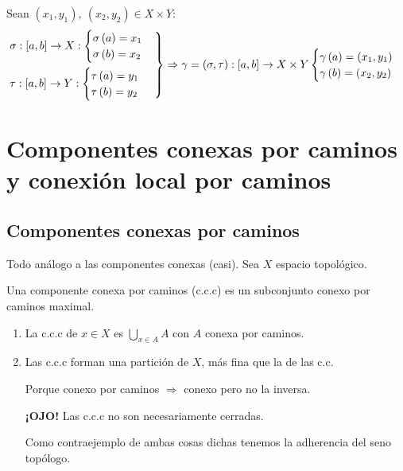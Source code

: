 \begin{prop}[Productos]
Sean $\left( x_1, y_1 \right),\ \left( x_2, y_2 \right) \in X \times Y$: 
\[
\begin{rcases}
    \sigma: \left[ a, b \right] \rightarrow X: \begin{cases}
        \sigma\left( a \right) = x_1\\
        \sigma\left( b \right) = x_2
    \end{cases}\\
    \tau: \left[ a, b \right] \rightarrow Y: \begin{cases}
        \tau\left( a \right) = y_1\\
        \tau\left( b \right) = y_2
    \end{cases}
\end{rcases} 
    \Rightarrow \gamma = \left( \sigma, \tau \right) : \left[ a, b \right] \rightarrow X \times Y \begin{cases}
        \gamma\left( a \right) = \left( x_1, y_1 \right)\\
        \gamma\left( b \right) = \left( x_2, y_2 \right)
    \end{cases}  
\]
\end{prop}


\chapter{Componentes conexas por caminos y conexión local por caminos}%
\label{cha:componentes_conexas_por_caminos_y_conexion_local_por_caminos}
\section{Componentes conexas por caminos}%
\label{sec:componentes_conexas_por_caminos}
Todo análogo a las componentes conexas (casi). Sea $X$ espacio topológico.
\begin{defi}
Una componente conexa por caminos (c.c.c) es un subconjunto conexo por caminos maximal.
\end{defi}
\begin{prop}[Descripción]
\begin{enumerate}
    \item La c.c.c de $x \in X$ es $\bigcup_{x \in A} A$ con $A$ conexa por caminos.
    \item Las c.c.c forman una partición de $X$, más fina que la de las c.c.
    \begin{demo}
        Porque conexo por caminos $\Rightarrow$ conexo pero no la inversa.

        \textbf{¡OJO!} Las c.c.c no son necesariamente cerradas. 

        Como contraejemplo de ambas cosas dichas tenemos la adherencia del seno topólogo. 
    \end{demo}
\end{enumerate} 
\end{prop}

